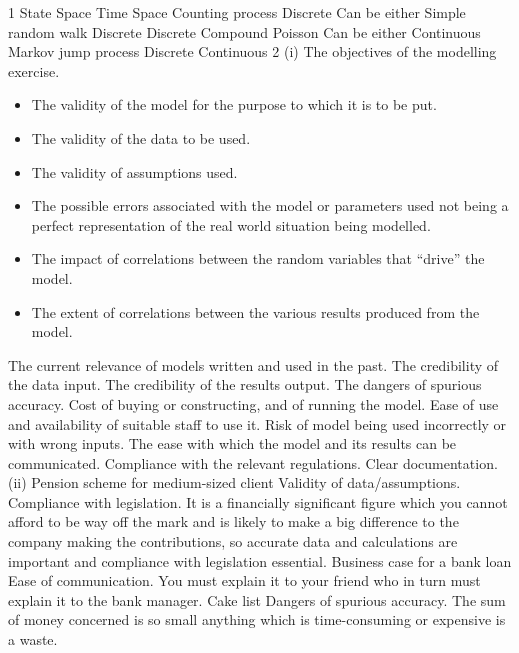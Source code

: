 \documentclass[a4paper,12pt]{article}
\begin{document}
1 State Space Time Space
Counting process Discrete Can be either
Simple random walk Discrete Discrete
Compound Poisson Can be either Continuous
Markov jump process Discrete Continuous
2 (i) The objectives of the modelling exercise.
\begin{itemize}
    \item The validity of the model for the purpose to which it is to be put.
    \item The validity of the data to be used.
    \item The validity of assumptions used.
    \item The possible errors associated with the model or parameters used not being a perfect representation of the real world situation being modelled.
    \item The impact of correlations between the random variables that “drive” the model.
    \item The extent of correlations between the various results produced from the
model.
\end{itemize}

The current relevance of models written and used in the past.
The credibility of the data input.
The credibility of the results output.
The dangers of spurious accuracy.
Cost of buying or constructing, and of running the model.
Ease of use and availability of suitable staff to use it.
Risk of model being used incorrectly or with wrong inputs.
The ease with which the model and its results can be communicated.
Compliance with the relevant regulations.
Clear documentation. 
(ii) Pension scheme for medium-sized client
Validity of data/assumptions. Compliance with legislation.
It is a financially significant figure which you cannot afford to be way off the mark and is likely to make a big difference to the company making the contributions, so accurate data and calculations are important and compliance with legislation essential.
Business case for a bank loan
Ease of communication.
You must explain it to your friend who in turn must explain it to the bank manager.
Cake list
Dangers of spurious accuracy.
The sum of money concerned is so small anything which is time-consuming or expensive is a waste. 
\end{document}
